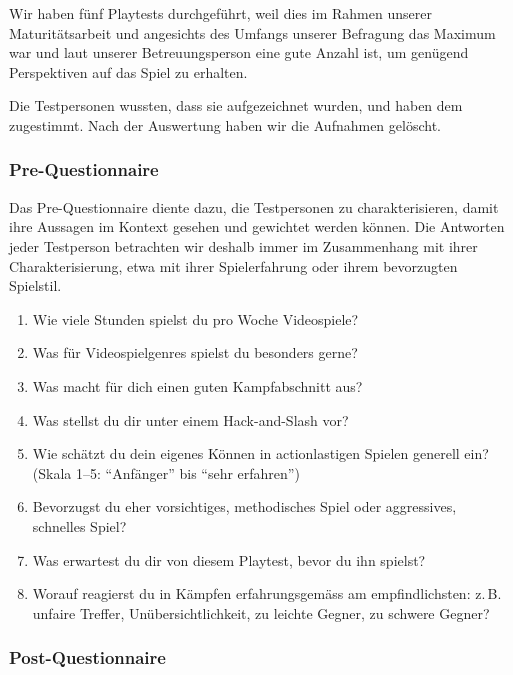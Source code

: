 \documentclass[../Main.tex]{subfiles}
\begin{document}
Wir haben fünf Playtests durchgeführt, weil dies im Rahmen unserer Maturitätsarbeit und angesichts des Umfangs unserer Befragung das Maximum war und laut unserer Betreuungsperson eine gute Anzahl ist, um genügend Perspektiven auf das Spiel zu erhalten.

Die Testpersonen wussten, dass sie aufgezeichnet wurden, und haben dem zugestimmt. Nach der Auswertung haben wir die Aufnahmen gelöscht.

\subsubsection{Pre-Questionnaire} \label{sec:PreQuestionnaire}

Das Pre-Questionnaire diente dazu, die Testpersonen zu charakterisieren, damit ihre Aussagen im Kontext gesehen und gewichtet werden können. Die Antworten jeder Testperson betrachten wir deshalb immer im Zusammenhang mit ihrer Charakterisierung, etwa mit ihrer Spielerfahrung oder ihrem bevorzugten Spielstil.

\begin{enumerate}[label=\textbf{P\arabic*}, leftmargin=1.5cm, itemsep=0.5em]
    \item Wie viele Stunden spielst du pro Woche Videospiele?
    \item Was für Videospielgenres spielst du besonders gerne?
    \item Was macht für dich einen guten Kampfabschnitt aus?
    \item Was stellst du dir unter einem Hack-and-Slash vor?
    \item Wie schätzt du dein eigenes Können in actionlastigen Spielen generell ein? (Skala 1--5: \enquote{Anfänger} bis \enquote{sehr erfahren})
    \item Bevorzugst du eher vorsichtiges, methodisches Spiel oder aggressives, schnelles Spiel?
    \item Was erwartest du dir von diesem Playtest, bevor du ihn spielst?
    \item Worauf reagierst du in Kämpfen erfahrungsgemäss am empfindlichsten: z.\,B. unfaire Treffer, Unübersichtlichkeit, zu leichte Gegner, zu schwere Gegner?
\end{enumerate}

\subsubsection{Post-Questionnaire} \label{sec:PostQuestionnaire}
\end{document}
